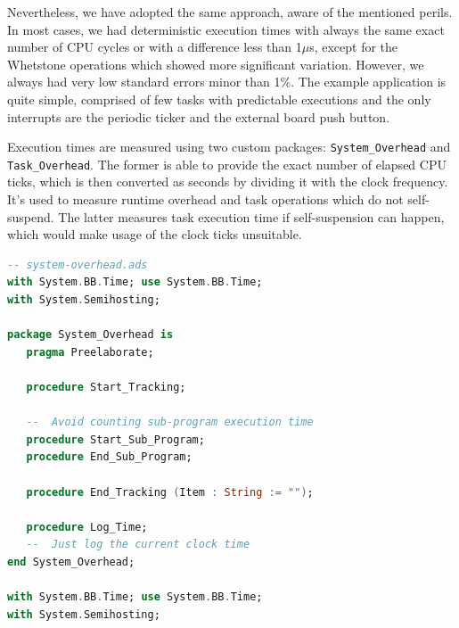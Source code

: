 \documentclass{article}
\begin{document}
Nevertheless, we have adopted the same approach, aware of the mentioned perils. In most cases, we had deterministic execution times with always the same exact number of CPU cycles or with a difference less than 1$\mu$s, except for the Whetstone operations which showed more significant variation. However, we always had very low standard errors minor than 1\%. The example application is quite simple, comprised of few tasks with predictable executions and the only interrupts are the periodic ticker and the external board push button.

Execution times are measured using two custom packages: \texttt{System\_Overhead} and \texttt{Task\_Overhead}. The former is able to provide the exact number of elapsed CPU ticks, which is then converted as seconds by dividing it with the clock frequency. It's used to measure runtime overhead and task operations which do not self-suspend. The latter measures task execution time if self-suspension can happen, which would make usage of the clock ticks unsuitable.

\begin{lstlisting}[language=Ada]
-- system-overhead.ads
with System.BB.Time; use System.BB.Time;
with System.Semihosting;

package System_Overhead is
   pragma Preelaborate;

   procedure Start_Tracking;

   --  Avoid counting sub-program execution time
   procedure Start_Sub_Program;
   procedure End_Sub_Program;

   procedure End_Tracking (Item : String := "");

   procedure Log_Time;
   --  Just log the current clock time
end System_Overhead;

with System.BB.Time; use System.BB.Time;
with System.Semihosting;
\end{lstlisting}
\end{document}
